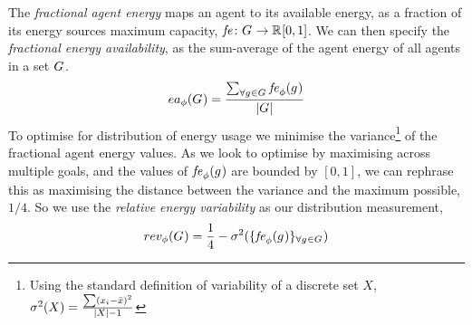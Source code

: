 \newcommand{\functionEnergyAvailable}[2]{
	\ifx \\#1\\
	\functionSignature{ea_{\varTime{}{}}}{\setAgents{}{}}
	\else
	\functionSignature{ea_{\varTime{}{}}}{#1}
	\fi
}
The \textit{fractional agent energy} maps an agent to its available energy, as a fraction of its energy sources maximum capacity, $\formalAgentEnergyAvailable{}{}$. We can then specify the \textit{fractional energy availability}, as the sum-average of the agent energy of all agents in a set $G_{}^{}$.
\begin{equation}
	\functionEnergyAvailable{}{} 
	= \dfrac{\sum_{\forall \varAgent{}{} \in \setAgents{}{}} \functionAgentEnergyAvailable{\varAgent{i}{}}{}}
	{\funcSize{\setAgents{}{}}}
\end{equation}
To optimise for distribution of energy usage we minimise the variance\footnote{Using the standard definition of variability of a discrete set $X$, $\sigma^2(X) = \frac{\sum (x_i - \bar{x})^2}{\lvert X \rvert-1}$} of the fractional agent energy values. As we look to optimise by maximising across multiple goals, and the values of $\functionAgentEnergyAvailable{}{}$ are bounded by $[0, 1]$, we can rephrase this as maximising the distance between the variance and the maximum possible, $1/4$. So we use the \textit{relative energy variability} as our distribution measurement,
\begin{equation}     	
	\functionEnergyVariability{}{} 
	= \frac{1}{4} - \sigma^2(
	\lbrace \functionAgentEnergyAvailable{}{}
	\rbrace_{\forall \varAgent{}{} \in \setAgents{}{}}
	)
\end{equation}



